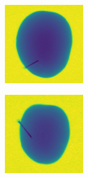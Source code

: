 \documentclass[11pt]{article}
\begin{document}
\begin{figure}[!h]
\begin{subfigure}[b]{0.22\textwidth}
         \caption{}
         \label{fig:metal_13}
     \end{subfigure}
     \hfill
     \begin{subfigure}[b]{0.22\textwidth}
         \centering
         \includegraphics[width=\textwidth]{figurer/potato_dataset/metal/metal_14.jpg}
         \caption{}
         \label{fig:metal_14}
     \end{subfigure}
     \hfill
     \begin{subfigure}[b]{0.22\textwidth}
         \centering
         \includegraphics[width=\textwidth]{figurer/potato_dataset/metal/metal_15.jpg}

\end{subfigure}
\end{figure}
\end{document}
